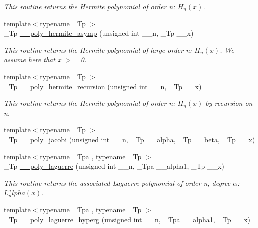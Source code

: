 \begin{DoxyCompactItemize}
\begin{DoxyCompactList}\small\item\em This routine returns the Hermite polynomial of order n\+: $ H_n(x) $. \end{DoxyCompactList}\item 
{\footnotesize template$<$typename \+\_\+\+Tp $>$ }\\\+\_\+\+Tp \hyperlink{namespacestd_1_1____detail_a34d8e6d2be42c2e9abb21a3090725912}{\+\_\+\+\_\+poly\+\_\+hermite\+\_\+asymp} (unsigned int \+\_\+\+\_\+n, \+\_\+\+Tp \+\_\+\+\_\+x)
\begin{DoxyCompactList}\small\item\em This routine returns the Hermite polynomial of large order n\+: $ H_n(x) $. We assume here that x $>$= 0. \end{DoxyCompactList}\item 
{\footnotesize template$<$typename \+\_\+\+Tp $>$ }\\\+\_\+\+Tp \hyperlink{namespacestd_1_1____detail_a4dbbb56aec75c28da046df01112ba2d0}{\+\_\+\+\_\+poly\+\_\+hermite\+\_\+recursion} (unsigned int \+\_\+\+\_\+n, \+\_\+\+Tp \+\_\+\+\_\+x)
\begin{DoxyCompactList}\small\item\em This routine returns the Hermite polynomial of order n\+: $ H_n(x) $ by recursion on n. \end{DoxyCompactList}\item 
{\footnotesize template$<$typename \+\_\+\+Tp $>$ }\\\+\_\+\+Tp \hyperlink{namespacestd_1_1____detail_a7fcc47c397903ac177380517e94153c6}{\+\_\+\+\_\+poly\+\_\+jacobi} (unsigned int \+\_\+\+\_\+n, \+\_\+\+Tp \+\_\+\+\_\+alpha, \+\_\+\+Tp \hyperlink{namespacestd_1_1____detail_a090d2f0920e0d208c467609b2a81d717}{\+\_\+\+\_\+beta}, \+\_\+\+Tp \+\_\+\+\_\+x)
\item 
{\footnotesize template$<$typename \+\_\+\+Tpa , typename \+\_\+\+Tp $>$ }\\\+\_\+\+Tp \hyperlink{namespacestd_1_1____detail_a76704115fd45b240802f4ccc433bb033}{\+\_\+\+\_\+poly\+\_\+laguerre} (unsigned int \+\_\+\+\_\+n, \+\_\+\+Tpa \+\_\+\+\_\+alpha1, \+\_\+\+Tp \+\_\+\+\_\+x)
\begin{DoxyCompactList}\small\item\em This routine returns the associated Laguerre polynomial of order n, degree $ \alpha $\+: $ L_n^alpha(x) $. \end{DoxyCompactList}\item 
{\footnotesize template$<$typename \+\_\+\+Tpa , typename \+\_\+\+Tp $>$ }\\\+\_\+\+Tp \hyperlink{namespacestd_1_1____detail_a1c817d7f5df1147829ad745176325cd6}{\+\_\+\+\_\+poly\+\_\+laguerre\+\_\+hyperg} (unsigned int \+\_\+\+\_\+n, \+\_\+\+Tpa \+\_\+\+\_\+alpha1, \+\_\+\+Tp \+\_\+\+\_\+x)

\end{DoxyCompactItemize}
